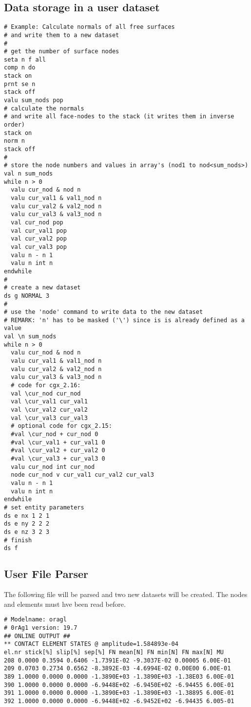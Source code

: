 \documentclass{article}
\begin{document}
\begin{appendix}
\subsection{\label{Data storage in a user dataset}Data storage in a user dataset}
\begin{verbatim}
# Example: Calculate normals of all free surfaces
# and write them to a new dataset
#
# get the number of surface nodes
seta n f all
comp n do
stack on
prnt se n
stack off
valu sum_nods pop
# calculate the normals
# and write all face-nodes to the stack (it writes them in inverse order)
stack on
norm n
stack off
#
# store the node numbers and values in array's (nod1 to nod<sum_nods>)
val n sum_nods
while n > 0
  valu cur_nod & nod n
  valu cur_val1 & val1_nod n
  valu cur_val2 & val2_nod n
  valu cur_val3 & val3_nod n
  val cur_nod pop
  val cur_val1 pop
  val cur_val2 pop
  val cur_val3 pop
  valu n - n 1
  valu n int n
endwhile
#
# create a new dataset
ds g NORMAL 3 
#
# use the 'node' command to write data to the new dataset
# REMARK: 'n' has to be masked ('\') since is is already defined as a value
val \n sum_nods
while n > 0
  valu cur_nod & nod n
  valu cur_val1 & val1_nod n
  valu cur_val2 & val2_nod n
  valu cur_val3 & val3_nod n
  # code for cgx_2.16:
  val \cur_nod cur_nod
  val \cur_val1 cur_val1
  val \cur_val2 cur_val2
  val \cur_val3 cur_val3
  # optional code for cgx_2.15:
  #val \cur_nod + cur_nod 0
  #val \cur_val1 + cur_val1 0
  #val \cur_val2 + cur_val2 0
  #val \cur_val3 + cur_val3 0
  valu cur_nod int cur_nod
  node cur_nod v cur_val1 cur_val2 cur_val3
  valu n - n 1
  valu n int n
endwhile
# set entity parameters
ds e nx 1 2 1
ds e ny 2 2 2
ds e nz 3 2 3
# finish
ds f
\end{verbatim}


\subsection{\label{User File Parser}User File Parser}
The following file will be parsed and two new datasets will be created. The nodes and elements must hve been read before.
\begin{verbatim}
# Modelname: oragl
# 0rAg1 version: 19.7
## ONLINE OUTPUT ##
** CONTACT ELEMENT STATES @ amplitude=1.584893e-04
el.nr stick[%] slip[%] sep[%] FN mean[N] FN min[N] FN max[N] MU
208 0.0000 0.3594 0.6406 -1.7391E-02 -9.3037E-02 0.00005 6.00E-01
209 0.0703 0.2734 0.6562 -8.3892E-03 -4.6994E-02 0.00E00 6.00E-01
389 1.0000 0.0000 0.0000 -1.3890E+03 -1.3890E+03 -1.38E03 6.00E-01
390 1.0000 0.0000 0.0000 -6.9448E+02 -6.9450E+02 -6.94455 6.00E-01
391 1.0000 0.0000 0.0000 -1.3890E+03 -1.3890E+03 -1.38895 6.00E-01
392 1.0000 0.0000 0.0000 -6.9448E+02 -6.9452E+02 -6.94435 6.005-01


\end{verbatim}
\end{appendix}
\end{document}
